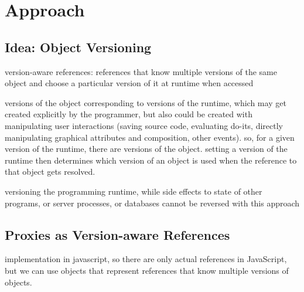 \section{Approach} \label{sec:APPROACH}




\subsection{Idea: Object Versioning}

version-aware references: references that know multiple versions of the same object and choose a particular version of it at runtime when accessed 

versions of the object corresponding to versions of the runtime, which may get created explicitly by the programmer, but also could be created with manipulating user interactions (saving source code, evaluating do-its, directly manipulating graphical attributes and composition, other events). so, for a given version of the runtime, there are versions of the object. setting a version of the runtime then determines which version of an object is used when the reference to that object gets resolved.

versioning the programming runtime, while side effects to state of other programs, or server processes, or databases cannot be reversed with this approach 






% 
% 





\subsection{Proxies as Version-aware References}

implementation in javascript, so there are only actual references in JavaScript, but we can use objects that represent references that know multiple versions of objects.

